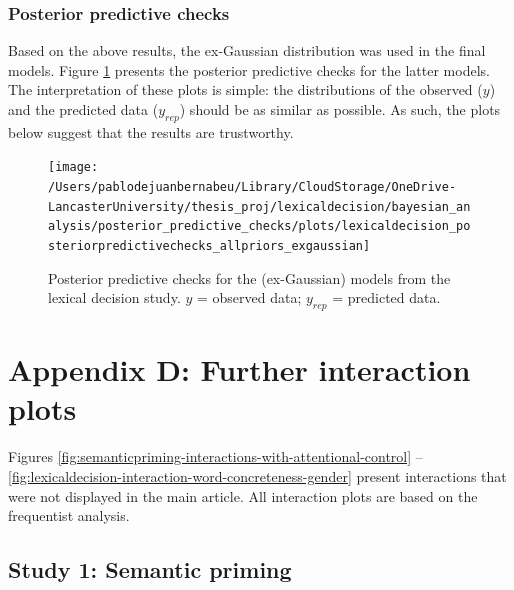 \documentclass[
  12pt,
  man,floatsintext]{apa7}
\begin{document}
\hypertarget{posterior-predictive-checks-2}{%
\subsubsection{Posterior predictive checks}\label{posterior-predictive-checks-2}}

Based on the above results, the ex-Gaussian distribution was used in the final models. Figure \ref{fig:lexicaldecision-posteriorpredictivechecks-allpriors-exgaussian} presents the posterior predictive checks for the latter models. The interpretation of these plots is simple: the distributions of the observed (\(y\)) and the predicted data (\(y_{rep}\)) should be as similar as possible. As such, the plots below suggest that the results are trustworthy.



\begin{figure}

{\centering \texttt{[image: /Users/pablodejuanbernabeu/Library/CloudStorage/OneDrive-LancasterUniversity/thesis\_proj/lexicaldecision/bayesian\_analysis/posterior\_predictive\_checks/plots/lexicaldecision\_posteriorpredictivechecks\_allpriors\_exgaussian]} 

}

\caption{Posterior predictive checks for the (ex-Gaussian) models from the lexical decision study. \(y\) = observed data; \(y_{rep}\) = predicted data.}\label{fig:lexicaldecision-posteriorpredictivechecks-allpriors-exgaussian}
\end{figure}

\clearpage

\renewcommand{\thefigure}{D\arabic{figure}} \setcounter{figure}{0}
\renewcommand{\thetable}{D\arabic{table}} \setcounter{table}{0}

\hypertarget{appendix-D-interaction-plots}{%
\section{Appendix D: Further interaction plots}\label{appendix-D-interaction-plots}}

Figures \ref{fig:semanticpriming-interactions-with-attentional-control} -- \ref{fig:lexicaldecision-interaction-word-concreteness-gender} present interactions that were not displayed in the main article. All interaction plots are based on the frequentist analysis.

\hypertarget{study-1-semantic-priming-2}{%
\subsection{Study 1: Semantic priming}\label{study-1-semantic-priming-2}}
\end{document}
